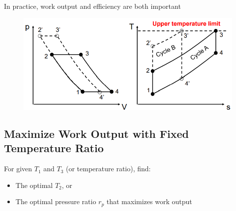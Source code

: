 \documentclass[class=report, crop=false, 12pt,a4paper]{standalone}
\numberwithin{equation}{section}
\begin{document}
In practice, work output and efficiency are both important
\begin{figure}[H]
  \centering
  \includegraphics[width = 0.8 \textwidth]{../img/diagram158.png}
  \caption{}
\end{figure}
\subsection{Maximize Work Output with Fixed Temperature Ratio}
For given $T_1$ and $T_3$ (or temperature ratio), find:
\begin{itemize}[noitemsep]
  \item The optimal $T_2$, or
  \item The optimal pressure ratio $r_p$ that maximizes work output
\end{itemize}
\end{document}
